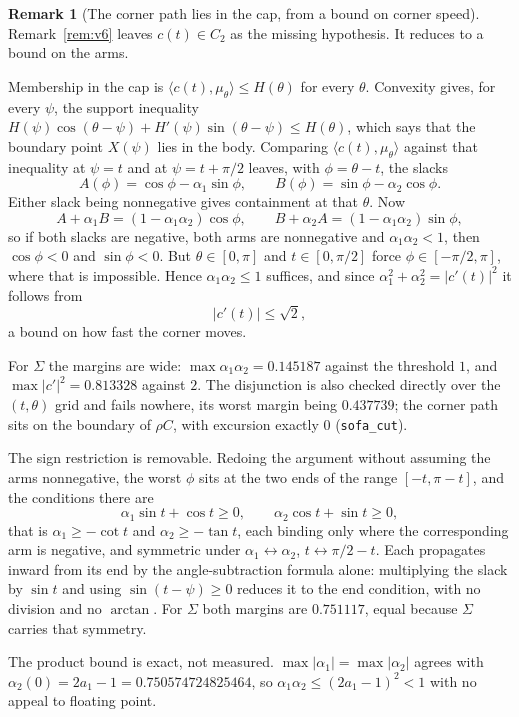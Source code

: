 \documentclass[11pt]{article}
\theoremstyle{definition}
\newtheorem{remark}[theorem]{Remark}
\newcommand{\Sig}{\Sigma}
\begin{document}
\begin{remark}[The corner path lies in the cap, from a bound on corner speed]\label{rem:v7}
Remark~\ref{rem:v6} leaves $c(t)\in C_2$ as the missing hypothesis. It reduces to a bound on
the arms.

Membership in the cap is $\langle c(t),\mu_\theta\rangle\le H(\theta)$ for every $\theta$.
Convexity gives, for every $\psi$, the support inequality
$H(\psi)\cos(\theta-\psi)+H'(\psi)\sin(\theta-\psi)\le H(\theta)$, which says that the
boundary point $X(\psi)$ lies in the body. Comparing $\langle c(t),\mu_\theta\rangle$ against
that inequality at $\psi=t$ and at $\psi=t+\pi/2$ leaves, with $\phi=\theta-t$, the slacks
\[
  A(\phi)=\cos\phi-\alpha_1\sin\phi,\qquad B(\phi)=\sin\phi-\alpha_2\cos\phi .
\]
Either slack being nonnegative gives containment at that $\theta$. Now
\[
  A+\alpha_1 B=(1-\alpha_1\alpha_2)\cos\phi,\qquad B+\alpha_2 A=(1-\alpha_1\alpha_2)\sin\phi,
\]
so if both slacks are negative, both arms are nonnegative and $\alpha_1\alpha_2<1$, then
$\cos\phi<0$ and $\sin\phi<0$. But $\theta\in[0,\pi]$ and $t\in[0,\pi/2]$ force
$\phi\in[-\pi/2,\pi]$, where that is impossible. Hence $\alpha_1\alpha_2\le1$ suffices, and
since $\alpha_1^2+\alpha_2^2=|c'(t)|^2$ it follows from
\[
  |c'(t)|\le\sqrt2 ,
\]
a bound on how fast the corner moves.

For $\Sig$ the margins are wide: $\max\alpha_1\alpha_2=0.145187$ against the threshold $1$,
and $\max|c'|^2=0.813328$ against $2$. The disjunction is also checked directly over the
$(t,\theta)$ grid and fails nowhere, its worst margin being $0.437739$; the corner path sits
on the boundary of $\rho C$, with excursion exactly $0$ (\verb|sofa_cut|).

The sign restriction is removable. Redoing the argument without assuming the arms
nonnegative, the worst $\phi$ sits at the two ends of the range $[-t,\pi-t]$, and the
conditions there are
\[
  \alpha_1\sin t+\cos t\ge0,\qquad \alpha_2\cos t+\sin t\ge0,
\]
that is $\alpha_1\ge-\cot t$ and $\alpha_2\ge-\tan t$, each binding only where the
corresponding arm is negative, and symmetric under $\alpha_1\leftrightarrow\alpha_2$,
$t\leftrightarrow\pi/2-t$. Each propagates inward from its end by the angle-subtraction
formula alone: multiplying the slack by $\sin t$ and using $\sin(t-\psi)\ge0$ reduces it to
the end condition, with no division and no $\arctan$. For $\Sig$ both margins are
$0.751117$, equal because $\Sig$ carries that symmetry.

The product bound is exact, not measured. $\max|\alpha_1|=\max|\alpha_2|$ agrees with
$\alpha_2(0)=2a_1-1=0.750574724825464$, so $\alpha_1\alpha_2\le(2a_1-1)^2<1$ with no appeal
to floating point.


\end{remark}
\end{document}

